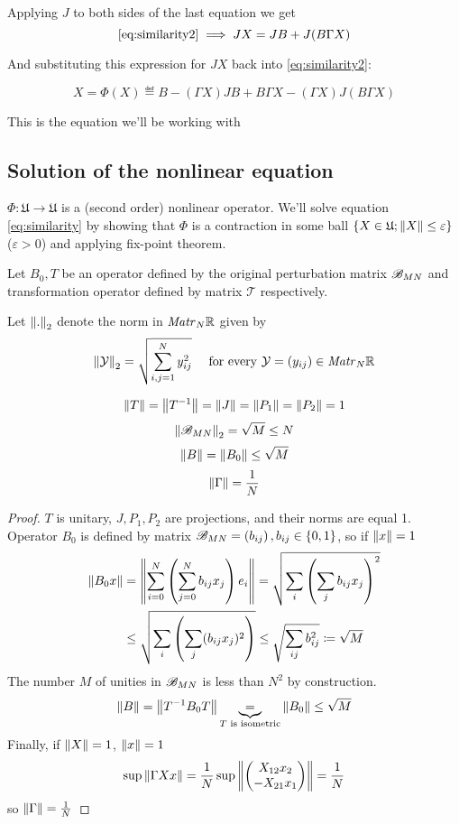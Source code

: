 \documentclass{article}
\begin{document}
Applying \( J \) to both sides of the last equation we get
\[\eqref{eq:similarity2} \implies
JX = JB + J(B\Gamma X)\]

And substituting this expression for \( JX \) back into \eqref{eq:similarity2}:

\begin{equation}\label{eq:similarity}
    X = \Phi(X) \eqdef B - (\Gamma X) JB + B\Gamma X - (\Gamma X) J(B\Gamma X)
\end{equation}

This is the equation we'll be working with

\subsection{Solution of the nonlinear equation}
\( \Phi:\mathfrak U\to\mathfrak U \) is a (second order) nonlinear operator.
We'll solve equation \eqref{eq:similarity}
by showing that \( \Phi \) is a contraction in some ball \( \{ X\in \mathfrak U; \norm{X} \leq \varepsilon \} \) (\( \varepsilon>0 \))
and applying fix-point theorem.

Let \( B_0, T \) be an operator defined by the original perturbation matrix \( \perturbmatrix{M}{N} \)
and transformation operator defined by matrix \( \mathcal T \) respectively.

Let \( \normex{2}{.} \) denote the norm in \( \matr{N}{\RR} \) given by
\[\normex{2}{\mathcal Y} = \sqrt{\sum_{i,j=1}^N y_{ij}^2} \quad\text{ for every } \mathcal Y = \left(y_{ij}\right) \in \matr{N}{\RR}\]
\begin{lemma}
    \[\norm T = \norm{T^{-1}} = \norm J = \norm{P_1} = \norm{P_2} = 1\]
    \[\normex{2}{\perturbmatrix{M}{N}} = \sqrt{M} \leq N\]
    \[\norm B = \norm{B_0} \leq \sqrt M\]
    \[\norm{\Gamma} = \frac{1}{N}\]
\end{lemma}
\begin{proof}
    \( T \) is unitary, \( J, P_1, P_2 \) are projections, and their norms are equal 1.
    Operator \( B_0 \) is defined by matrix \( \perturbmatrix{M}{N} = \left(b_{ij}\right), b_{ij}\in\{0,1\} \),
    so if \( \norm x = 1 \)
    \[
        \begin{split}
            \norm{B_0 x} &= \norm{\sum_{i=0}^N \left(\sum_{j=0}^N b_{ij} x_j\right) e_i}
            = \sqrt{\sum_i \left(\sum_j b_{ij} x_j\right)^2} \\
            &\leq \sqrt{\sum_i \left(\sum_j (b_{ij} x_j)^2\right)}
            \leq \sqrt{\sum_{ij} b_{ij}^2} \eqdef \sqrt M
        \end{split}
    \]
The number \( M \) of unities in \( \perturbmatrix{M}{N} \) is less than \( N^2 \) by construction.
\[\norm B = \norm{T^{-1} B_0 T} \underbrace{=}_{T \text{ is isometric}} \norm{B_0} \leq \sqrt M\]
    Finally, if \( \norm X = 1 \), \( \norm x = 1 \)
    \[\sup\norm{\Gamma X x} = \frac1N \sup\norm{\begin{pmatrix}X_{12}x_2 \\ -X_{21}x_1\end{pmatrix}}
                            = \frac1N\]
    so \( \norm\Gamma = \frac1N \)
\end{proof}
\end{document}
